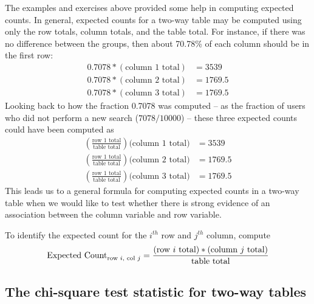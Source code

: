 The examples and exercises above provided some help in computing expected counts. In general, expected counts for a two-way table may be computed using only the row totals, column totals, and the table total. For instance, if there was no difference between the groups, then about 70.78\% of each column should be in the first row:
\begin{align*}
0.7078*(\text{column 1 total}) &= 3539 \\
0.7078*(\text{column 2 total}) &= 1769.5 \\
0.7078*(\text{column 3 total}) &= 1769.5
\end{align*}
Looking back to how the fraction 0.7078 was computed -- as the fraction of users who did not perform a new search ($7078/10000$) -- these three expected counts could have been computed as
\begin{align*}
\left(\frac{\text{row 1 total}}{\text{table total}}\right)\text{(column 1 total)} &= 3539 \\
\left(\frac{\text{row 1 total}}{\text{table total}}\right)\text{(column 2 total)} &= 1769.5 \\
\left(\frac{\text{row 1 total}}{\text{table total}}\right)\text{(column 3 total)} &= 1769.5
\end{align*}
This leads us to a general formula for computing expected counts in a two-way table when we would like to test whether there is strong evidence of an association between the column variable and row variable.

\begin{termBox}{
To identify the expected count for the $i^{th}$ row and $j^{th}$ column, compute
$$\text{Expected Count}_{\text{row }i,\text{ col }j} = \frac{(\text{row $i$ total}) * (\text{column $j$ total})}{\text{table total}}\vspace{2mm}$$}
\end{termBox}

\subsection{The chi-square test statistic for two-way tables}

